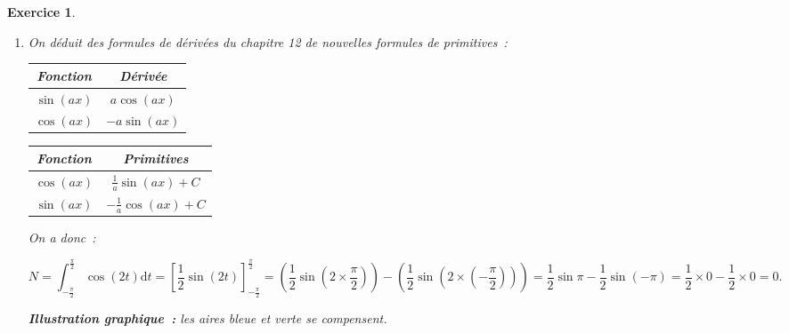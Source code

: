 \documentclass[10pt]{article}
\newtheorem{exo}{Exercice}
\begin{document}
\begin{exo}
\begin{enumerate}
On a donc~:

\[M=\int_{1}^{\text{e}} \frac{(\ln t)^3}{t}\mathrm{d}t=\left[\frac{1}{4}(\ln t)^4\right]_1^{\text{e}}
=\left(\frac{1}{4}\left(\ln \text{e}\right)^4\right)-\left(\frac{1}{4}(\ln 1)^4\right)=\frac{1}{4}\times 1^4-\frac{1}{4}\times 0^4=\frac{1}{4}.\]
\item On déduit des formules de dérivées du chapitre 12 de nouvelles formules de primitives~:

\begin{multicols}{2}

\begin{center}
\renewcommand{\arraystretch}{1.5}
\begin{tabular}{|c|c|} \hline
\textbf{Fonction}& \textbf{Dérivée}\\ \hline
$\sin (ax)$&$a\cos (ax)$\\ \hline
$\cos (ax)$&$-a\sin (ax)$ \\ \hline
\end{tabular}
\end{center}

\begin{center}
\renewcommand{\arraystretch}{1.5}
\begin{tabular}{|c|c|} \hline
\textbf{Fonction}& \textbf{Primitives}\\ \hline
$\cos (ax)$&$\frac{1}{a}\sin (ax)+C$\\ \hline
$\sin (ax)$&$-\frac{1}{a}\cos (ax)+C$ \\ \hline
\end{tabular}
\end{center}
\end{multicols}

\medskip


On a donc~:

\[N=\int_{-\frac{\pi}{2}}^{\frac{\pi}{2}}\cos (2t)\mathrm{d}t=\left[\frac{1}{2}\sin(2t)\right]_{-\frac{\pi}{2}}^{\frac{\pi}{2}}=\left(\frac{1}{2}\sin\left(2\times\frac{\pi}{2}\right)\right)-\left(\frac{1}{2}\sin\left(2\times \left(-\frac{\pi}{2}\right)\right)\right)=\frac{1}{2}\sin\pi-\frac{1}{2}\sin (-\pi)=\frac{1}{2}\times 0-\frac{1}{2}\times 0=0.\]

\medskip

\textbf{Illustration graphique~:} les aires bleue et verte se compensent.


\begin{center}



\end{center}
\end{enumerate}
\end{exo}
\end{document}
